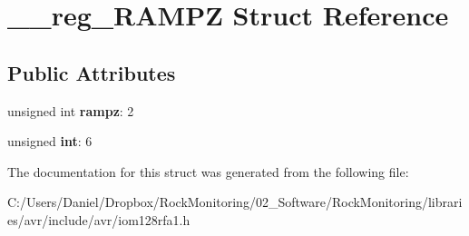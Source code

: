 \hypertarget{struct____reg___r_a_m_p_z}{}\section{\+\_\+\+\_\+reg\+\_\+\+R\+A\+M\+PZ Struct Reference}
\label{struct____reg___r_a_m_p_z}
\subsection*{Public Attributes}
\begin{DoxyCompactItemize}
\item 
unsigned int {\bfseries rampz}\+: 2\hypertarget{struct____reg___r_a_m_p_z_a5d42fd3b791db1eecc4237e76c9d16f6}{}\label{struct____reg___r_a_m_p_z_a5d42fd3b791db1eecc4237e76c9d16f6}

\item 
unsigned {\bfseries int}\+: 6\hypertarget{struct____reg___r_a_m_p_z_a78346a3e425a5dea70e1fb84baa3b6af}{}\label{struct____reg___r_a_m_p_z_a78346a3e425a5dea70e1fb84baa3b6af}

\end{DoxyCompactItemize}


The documentation for this struct was generated from the following file\+:\begin{DoxyCompactItemize}
\item 
C\+:/\+Users/\+Daniel/\+Dropbox/\+Rock\+Monitoring/02\+\_\+\+Software/\+Rock\+Monitoring/libraries/avr/include/avr/iom128rfa1.\+h\end{DoxyCompactItemize}
